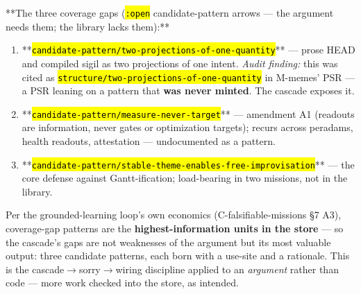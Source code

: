 \documentclass[11pt,oneside]{article}
\newcommand{\scopehl}[1]{\texttt{\hl{#1}}}
\begin{document}
\begin{phasebox}[title={4. ARGUE (2026-06-10) --- the lifeform's self-argument: why should I exist?}]
\begin{subbox}[title={4.2 The argument from the pattern language --- a small cascade}]
**The three coverage gaps (\scopehl{:open} candidate-pattern arrows --- the argument
needs them; the library lacks them):**

\begin{enumerate}[leftmargin=1.4em,itemsep=1pt]
\item **\scopehl{candidate-pattern/two-projections-of-one-quantity}** --- prose HEAD and compiled sigil as two projections of one intent. \emph{Audit finding:} this was cited as \scopehl{structure/two-projections-of-one-quantity} in M-memes' PSR --- a PSR leaning on a pattern that \textbf{was never minted}. The cascade exposes it.
\item **\scopehl{candidate-pattern/measure-never-target}** --- amendment A1 (readouts are information, never gates or optimization targets); recurs across peradams, health readouts, attestation --- undocumented as a pattern.
\item **\scopehl{candidate-pattern/stable-theme-enables-free-improvisation}** --- the core defense against Gantt-ification; load-bearing in two missions, not in the library.
\end{enumerate}

Per the grounded-learning loop's own economics (C-falsifiable-missions \S{}7 A3),
coverage-gap patterns are the \textbf{highest-information units in the store} ---
so the cascade's gaps are not weaknesses of the argument but its most
valuable output: three candidate patterns, each born with a use-site and a
rationale. This is the cascade$\rightarrow$sorry$\rightarrow$wiring discipline applied to an
\emph{argument} rather than code --- more work checked into the store, as intended.

\end{subbox}
\end{phasebox}
\end{document}
